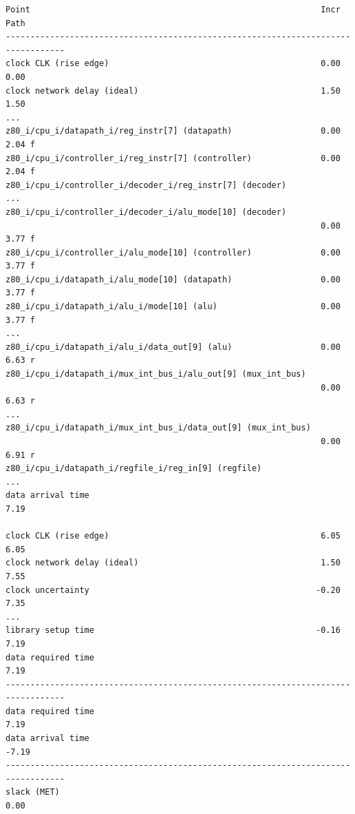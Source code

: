 \documentclass[ngerman, cd=lightcolor]{tudscrreprt}
\begin{document}
\begin{center}
  \begin{minipage}{.8\textwidth}
    \begin{verbatim}
Point                                                           Incr       Path
----------------------------------------------------------------------------------
clock CLK (rise edge)                                           0.00       0.00
clock network delay (ideal)                                     1.50       1.50
...
z80_i/cpu_i/datapath_i/reg_instr[7] (datapath)                  0.00       2.04 f
z80_i/cpu_i/controller_i/reg_instr[7] (controller)              0.00       2.04 f
z80_i/cpu_i/controller_i/decoder_i/reg_instr[7] (decoder)
...
z80_i/cpu_i/controller_i/decoder_i/alu_mode[10] (decoder)
                                                                0.00       3.77 f
z80_i/cpu_i/controller_i/alu_mode[10] (controller)              0.00       3.77 f
z80_i/cpu_i/datapath_i/alu_mode[10] (datapath)                  0.00       3.77 f
z80_i/cpu_i/datapath_i/alu_i/mode[10] (alu)                     0.00       3.77 f
...
z80_i/cpu_i/datapath_i/alu_i/data_out[9] (alu)                  0.00       6.63 r
z80_i/cpu_i/datapath_i/mux_int_bus_i/alu_out[9] (mux_int_bus)
                                                                0.00       6.63 r
...
z80_i/cpu_i/datapath_i/mux_int_bus_i/data_out[9] (mux_int_bus)
                                                                0.00       6.91 r
z80_i/cpu_i/datapath_i/regfile_i/reg_in[9] (regfile)
...
data arrival time                                                          7.19

clock CLK (rise edge)                                           6.05       6.05
clock network delay (ideal)                                     1.50       7.55
clock uncertainty                                              -0.20       7.35
...
library setup time                                             -0.16       7.19
data required time                                                         7.19
----------------------------------------------------------------------------------
data required time                                                         7.19
data arrival time                                                         -7.19
----------------------------------------------------------------------------------
slack (MET)                                                                0.00
    \end{verbatim}
  \end{minipage}
\end{center}
\end{document}

